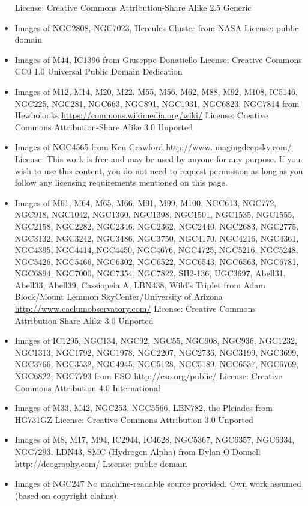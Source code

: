 \begin{itemize}
	 License: Creative Commons Attribution-Share Alike 2.5 Generic 
\item Images of NGC2808, NGC7023, Hercules Cluster 
from NASA
	 License: public domain
\item Images of M44, IC1396 
	from Giuseppe Donatiello
	 License: Creative Commons CC0 1.0 Universal Public Domain Dedication
\item Images of M12, M14, M20, M22, M55, M56, M62, M88, M92, M108, 
	 IC5146, NGC225, NGC281, NGC663, NGC891, NGC1931, NGC6823, NGC7814
	 from Hewholooks
	 \url{https://commons.wikimedia.org/wiki/}
	 License: Creative Commons Attribution-Share Alike 3.0 Unported
\item Images of NGC4565 from Ken Crawford
	 \url{http://www.imagingdeepsky.com/}
	 License: This work is free and may be used by anyone for any purpose.
	 If you wish to use this content, you do not need to request permission
	 as long as you follow any licensing requirements mentioned on this page.
\item Images of M61, M64, M65, M66, M91, M99, M100, NGC613, NGC772, NGC918, NGC1042, NGC1360, NGC1398,
	 NGC1501, NGC1535, NGC1555, NGC2158, NGC2282, NGC2346, NGC2362, NGC2440, NGC2683, NGC2775, NGC3132,
	 NGC3242, NGC3486, NGC3750, NGC4170, NGC4216, NGC4361, NGC4395, NGC4414,,NGC4450, NGC4676, NGC4725,
	 NGC5216, NGC5248, NGC5426, NGC5466, NGC6302, NGC6522, NGC6543, NGC6563, NGC6781, NGC6894, NGC7000,
	 NGC7354, NGC7822, SH2-136, UGC3697, Abell31, Abell33, Abell39, Cassiopeia A, LBN438, Wild's Triplet
	 from Adam Block/Mount Lemmon SkyCenter/University of Arizona
	 \url{http://www.caelumobservatory.com/}
	 License: Creative Commons Attribution-Share Alike 3.0 Unported
\item Images of IC1295, NGC134, NGC92, NGC55, NGC908, NGC936, NGC1232, NGC1313,
	 NGC1792, NGC1978, NGC2207, NGC2736, NGC3199, NGC3699, NGC3766, NGC3532, NGC4945, NGC5128, NGC5189,
	 NGC6537, NGC6769, NGC6822, NGC7793
	 from ESO
	 \url{http://eso.org/public/}
	 License: Creative Commons Attribution 4.0 International
\item Images of M33, M42, NGC253, NGC5566, LBN782, the Pleiades 
	from HG731GZ
	 License: Creative Commons Attribution 3.0 Unported
\item Images of M8, M17, M94, IC2944, IC4628, NGC5367, NGC6357,
	 NGC6334, NGC7293, LDN43, SMC (Hydrogen Alpha)
	 from Dylan O'Donnell
	 \url{http://deography.com/}
	 License: public domain
\item Images of NGC247
	 No machine-readable source provided. Own work assumed (based on copyright claims).

\end{itemize}
